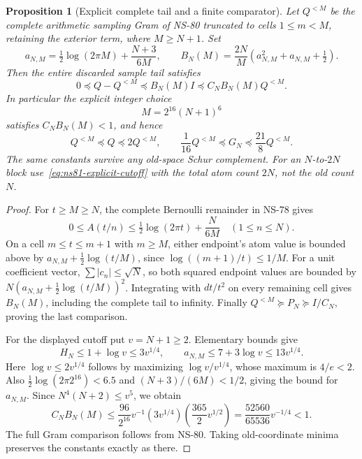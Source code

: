 \documentclass[11pt]{article}
\newtheorem{proposition}[theorem]{Proposition}
\theoremstyle{remark}
\begin{document}
\begin{proposition}[Explicit complete tail and a finite comparator]
\label{prop:ns81-finite-comparator}
Let $Q^{<M}$ be the complete arithmetic sampling Gram of NS-80 truncated
to cells $1\leq m<M$, retaining the exterior term, where $M\geq N+1$.
Set
\[
 a_{N,M}=\tfrac12\log(2\pi M)+\frac{N+3}{6M},\qquad
 B_N(M)=\frac{2N}{M}\left(a_{N,M}^2+a_{N,M}+\tfrac12\right).
\]
Then the entire discarded sample tail satisfies
\begin{equation}
 0\preceq Q-Q^{<M}\preceq B_N(M)I
                  \preceq C_NB_N(M)Q^{<M}.
 \label{eq:ns81-tail-matrix}
\end{equation}
In particular the explicit integer choice
\begin{equation}
 M=2^{16}(N+1)^6
 \label{eq:ns81-explicit-cutoff}
\end{equation}
satisfies $C_NB_N(M)<1$, and hence
\[
 Q^{<M}\preceq Q\preceq2Q^{<M},\qquad
 \frac1{16}Q^{<M}\preceq G_N\preceq\frac{21}{8}Q^{<M}.
\]
The same constants survive any old-space Schur complement. For an
$N$-to-$2N$ block use~\eqref{eq:ns81-explicit-cutoff} with the total
atom count $2N$, not the old count $N$.
\end{proposition}
\begin{proof}
For $t\geq M\geq N$, the complete Bernoulli remainder in NS-78 gives
\[
 0\leq A(t/n)\leq\tfrac12\log(2\pi t)+\frac{N}{6M}
 \quad(1\leq n\leq N).
\]
On a cell $m\leq t\leq m+1$ with $m\geq M$, either endpoint's
atom value is bounded above by
$a_{N,M}+\tfrac12\log(t/M)$, since
$\log((m+1)/t)\leq1/M$. For a unit coefficient vector,
$\sum|c_n|\leq\sqrt N$, so both squared endpoint values are bounded
by $N(a_{N,M}+\tfrac12\log(t/M))^2$.
Integrating with $dt/t^2$ on every remaining cell gives $B_N(M)$,
including the complete tail to infinity. Finally
$Q^{<M}\succeq P_N\succeq I/C_N$, proving the last comparison.

For the displayed cutoff put $v=N+1\geq2$. Elementary bounds give
\[
 H_N\leq1+\log v\leq3v^{1/4},\qquad
 a_{N,M}\leq7+3\log v\leq13v^{1/4}.
\]
Here $\log v\leq2v^{1/4}$ follows by maximizing
$\log v/v^{1/4}$, whose maximum is $4/e<2$.
Also $\tfrac12\log(2\pi2^{16})<6.5$ and
$(N+3)/(6M)<1/2$, giving the bound for $a_{N,M}$.
Since $N^4(N+2)\leq v^5$, we obtain
\[
 C_NB_N(M)
 \leq\frac{96}{2^{16}}v^{-1}
       (3v^{1/4})\left(\frac{365}{2}v^{1/2}\right)
 =\frac{52560}{65536}v^{-1/4}<1.
\]
The full Gram comparison follows from NS-80. Taking old-coordinate
minima preserves the constants exactly as there.
\end{proof}
\end{document}
